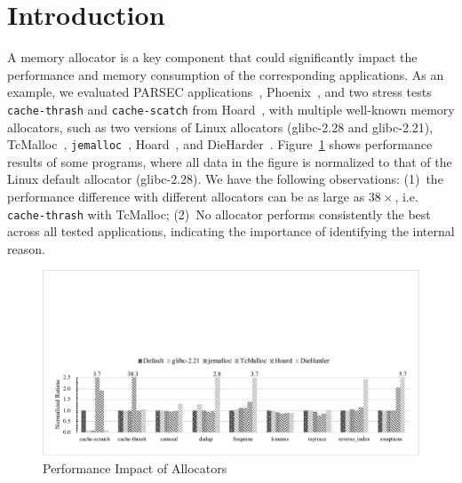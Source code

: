 

\section{Introduction}
\label{sec:intro}

A memory allocator is a key component that could significantly impact the performance and memory consumption of the corresponding applications. As an example, we evaluated PARSEC applications~\cite{parsec}, Phoenix~\cite{phoenix}, and two stress tests  \texttt{cache-thrash} and \texttt{cache-scatch} from Hoard~\cite{Hoard}, with multiple well-known memory allocators, such as two versions of Linux allocators (glibc-2.28 and glibc-2.21), TcMalloc~\cite{tcmalloc}, \texttt{jemalloc}~\cite{jemalloc},  Hoard~\cite{Hoard}, and DieHarder~\cite{DieHarder}. Figure~\ref{fig:motivation} shows performance results of some programs, where all data in the figure is normalized to that of the Linux default allocator (glibc-2.28). We have the following observations: (1)~the performance difference with different allocators can be as large as $38\times$, i.e. \texttt{cache-thrash} with TcMalloc; (2)~No allocator performs consistently the best across all tested applications, indicating the importance of identifying the internal reason.

\begin{figure}[!ht]
\centering
\includegraphics[width=0.98\columnwidth]{figures/motivation}
\caption{Performance Impact of Allocators\label{fig:motivation}}
\end{figure}

